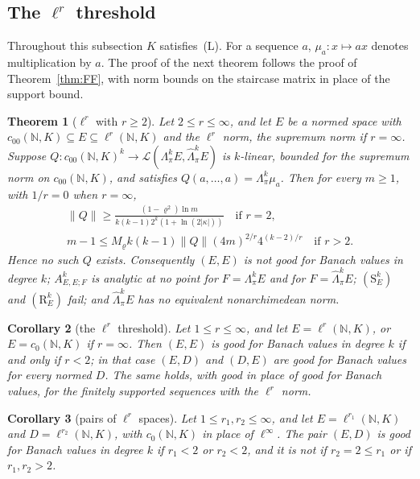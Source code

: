 \documentclass[11pt]{amsart}
\newtheorem{theorem}{Theorem}[section]
\newtheorem{corollary}[theorem]{Corollary}
\theoremstyle{definition}
\theoremstyle{remark}
\numberwithin{equation}{section}
\newcommand{\N}{\mathbb N}
\newcommand{\cL}{\mathcal L}
\newcommand{\abs}[1]{\lvert #1\rvert}
\newcommand{\norm}[1]{\lVert #1\rVert}
\theoremstyle{plain}
\theoremstyle{definition}
\theoremstyle{plain}
\begin{document}
\subsection{The \texorpdfstring{$\ell^r$}{l\textasciicircum r} threshold}\label{fib:ssec:local}
Throughout this subsection $K$ satisfies~\textup{(L)}. For a sequence $a$, $\mu_a\colon x\mapsto ax$ denotes
multiplication by $a$. The proof of the next theorem follows the proof of Theorem~\ref{thm:FF}, with norm bounds on the
staircase matrix in place of the support bound.

\begin{theorem}[$\ell^r$ with $r\ge2$]\label{fib:thm:ell2}
Let $2\le r\le\infty$, and let $E$ be a normed space with $c_{00}(\N,K)\subseteq E\subseteq\ell^r(\N,K)$ and the
$\ell^r$ norm, the supremum norm if $r=\infty$. Suppose $Q\colon c_{00}(\N,K)^k\to\cL(\Lambda^k_\pi E,\widehat\Lambda^k_\pi E)$
is $k$\nobreakdash-linear, bounded for the supremum norm on $c_{00}(\N,K)$, and satisfies $Q(a,\dots,a)=\Lambda^k_\pi\mu_a$.
Then for every $m\ge1$, with $1/r=0$ when $r=\infty$,
\begin{equation}\label{fib:eq:quant}
 \begin{gathered}
 \norm Q\ge\frac{(1-\varrho^2)\ln m}{k(k-1)2^k(1+\ln(2\abs\kappa))}\quad\text{if }r=2,\\
 m-1\le M_\varrho k(k-1)\norm Q(4m)^{2/r}4^{(k-2)/r}\quad\text{if }r>2.
 \end{gathered}
\end{equation}
Hence no such $Q$ exists. Consequently $(E,E)$ is not good for Banach values in degree $k$; $A^k_{E,E;F}$ is analytic at
no point for $F=\Lambda^k_\pi E$ and for $F=\widehat\Lambda^k_\pi E$; $(\mathrm S^k_E)$ and $(\mathrm R^k_E)$ fail; and
$\widehat\Lambda^k_\pi E$ has no equivalent nonarchimedean norm.
\end{theorem}

\begin{corollary}[the $\ell^r$ threshold]\label{fib:cor:threshold}
Let $1\le r\le\infty$, and let $E=\ell^r(\N,K)$, or $E=c_0(\N,K)$ if $r=\infty$. Then $(E,E)$ is good for Banach
values in degree $k$ if and only if $r<2$; in that case $(E,D)$ and $(D,E)$ are good for Banach values for every normed
$D$. The same holds, with good in place of good for Banach values, for the finitely supported sequences with the
$\ell^r$ norm.
\end{corollary}

\begin{corollary}[pairs of $\ell^r$ spaces]\label{fib:cor:pairs}
Let $1\le r_1,r_2\le\infty$, and let $E=\ell^{r_1}(\N,K)$ and $D=\ell^{r_2}(\N,K)$, with $c_0(\N,K)$ in place of
$\ell^\infty$. The pair $(E,D)$ is good for Banach values in degree $k$ if $r_1<2$ or $r_2<2$, and it is not if
$r_2=2\le r_1$ or if $r_1,r_2>2$.
\end{corollary}
\end{document}
